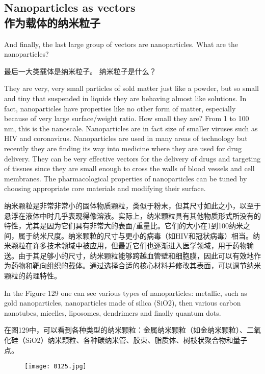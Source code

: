 \documentclass[dvipsnames, svgnames,a4paper,11pt]{article}
\begin{document}
\subsection{Nanoparticles as vectors \\作为载体的纳米粒子}


And finally, the last large group of vectors are nanoparticles. What are the
nanoparticles?

最后一大类载体是纳米粒子。 纳米粒子是什么？

They are very, very small particles of sold matter just like a powder, but so small and
tiny that suspended in liquids they are behaving almost like solutions. In fact,
nanoparticles have properties like no other form of matter, especially because of
very large surface/weight ratio. How small they are? From 1 to 100 nm, this is the
nanoscale. Nanoparticles are in fact size of smaller viruses such as HIV and
coronavirus. Nanoparticles are used in many areas of technology but recently they
are finding its way into medicine where they are used for drug delivery. They can be
very effective vectors for the delivery of drugs and targeting of tissues since they are
small enough to cross the walls of blood vessels and cell membranes. The
pharmacological properties of nanoparticles can be tuned by choosing appropriate
core materials and modifying their surface.

纳米颗粒是非常非常小的固体物质颗粒，类似于粉末，但其尺寸如此之小，以至于悬浮在液体中时几乎表现得像溶液。实际上，纳米颗粒具有其他物质形式所没有的特性，尤其是因为它们具有非常大的表面/重量比。它们的大小在1到100纳米之间，属于纳米尺度。纳米颗粒的尺寸与更小的病毒（如HIV和冠状病毒）相当。纳米颗粒在许多技术领域中被应用，但最近它们也逐渐进入医学领域，用于药物输送。由于其足够小的尺寸，纳米颗粒能够跨越血管壁和细胞膜，因此可以有效地作为药物和靶向组织的载体。通过选择合适的核心材料并修改其表面，可以调节纳米颗粒的药理特性。

In the Figure 129 one can see various types of nanoparticles: metallic, such as gold
nanoparticles, nanoparticles made of silica (SiO2), then various carbon nanotubes,
micelles, liposomes, dendrimers and finally quantum dots.

在图129中，可以看到各种类型的纳米颗粒：金属纳米颗粒（如金纳米颗粒）、二氧化硅（SiO2）纳米颗粒、各种碳纳米管、胶束、脂质体、树枝状聚合物和量子点。

\begin{figure}[h]
	\centering
    \texttt{[image: 0125.jpg]}    
     \label{fig129}
\end{figure}
\end{document}
